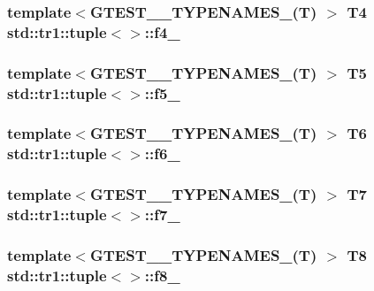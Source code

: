 \hypertarget{singletonstd_1_1tr1_1_1tuple_ab662f1051c2302d065796383848db6c4}{
\subsubsection[{f4\+\_\+}]{\setlength{\rightskip}{0pt plus 5cm}template$<$G\+T\+E\+S\+T\+\_\+\_\+\+T\+Y\+P\+E\+N\+A\+M\+E\+S\+\_\+(\+T) $>$ T4 {\bf std\+::tr1\+::tuple}$<$$>$\+::f4\+\_\+}}\label{singletonstd_1_1tr1_1_1tuple_ab662f1051c2302d065796383848db6c4}
\hypertarget{singletonstd_1_1tr1_1_1tuple_a32d8cd6f180c0a77d83733fc65423657}{
\subsubsection[{f5\+\_\+}]{\setlength{\rightskip}{0pt plus 5cm}template$<$G\+T\+E\+S\+T\+\_\+\_\+\+T\+Y\+P\+E\+N\+A\+M\+E\+S\+\_\+(\+T) $>$ T5 {\bf std\+::tr1\+::tuple}$<$$>$\+::f5\+\_\+}}\label{singletonstd_1_1tr1_1_1tuple_a32d8cd6f180c0a77d83733fc65423657}
\hypertarget{singletonstd_1_1tr1_1_1tuple_a597beab3af3f95c84408491ab14632b0}{
\subsubsection[{f6\+\_\+}]{\setlength{\rightskip}{0pt plus 5cm}template$<$G\+T\+E\+S\+T\+\_\+\_\+\+T\+Y\+P\+E\+N\+A\+M\+E\+S\+\_\+(\+T) $>$ T6 {\bf std\+::tr1\+::tuple}$<$$>$\+::f6\+\_\+}}\label{singletonstd_1_1tr1_1_1tuple_a597beab3af3f95c84408491ab14632b0}
\hypertarget{singletonstd_1_1tr1_1_1tuple_a7c28780e616d382833e844f62672c6bc}{
\subsubsection[{f7\+\_\+}]{\setlength{\rightskip}{0pt plus 5cm}template$<$G\+T\+E\+S\+T\+\_\+\_\+\+T\+Y\+P\+E\+N\+A\+M\+E\+S\+\_\+(\+T) $>$ T7 {\bf std\+::tr1\+::tuple}$<$$>$\+::f7\+\_\+}}\label{singletonstd_1_1tr1_1_1tuple_a7c28780e616d382833e844f62672c6bc}
\hypertarget{singletonstd_1_1tr1_1_1tuple_ae859012c83943e54e035a4a32089ccb6}{
\subsubsection[{f8\+\_\+}]{\setlength{\rightskip}{0pt plus 5cm}template$<$G\+T\+E\+S\+T\+\_\+\_\+\+T\+Y\+P\+E\+N\+A\+M\+E\+S\+\_\+(\+T) $>$ T8 {\bf std\+::tr1\+::tuple}$<$$>$\+::f8\+\_\+}}\label{singletonstd_1_1tr1_1_1tuple_ae859012c83943e54e035a4a32089ccb6}
